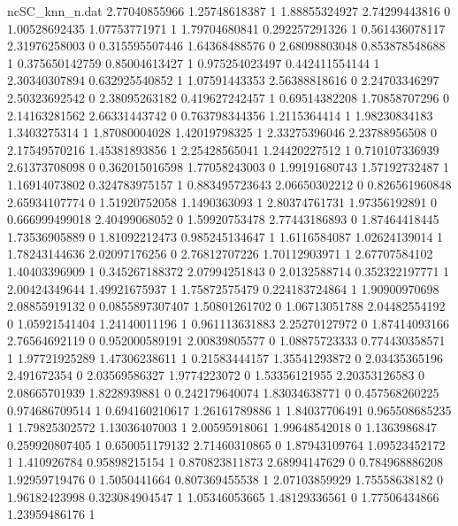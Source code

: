 \begin{filecontents}{ncSC_knn_n.dat}
2.77040855966 1.25748618387 1
1.88855324927 2.74299443816 0
1.00528692435 1.07753771971 1
1.79704680841 0.292257291326 1
0.561436078117 2.31976258003 0
0.315595507446 1.64368488576 0
2.68098803048 0.853878548688 1
0.375650142759 0.85004613427 1
0.975254023497 0.442411554144 1
2.30340307894 0.632925540852 1
1.07591443353 2.56388818616 0
2.24703346297 2.50323692542 0
2.38095263182 0.419627242457 1
0.69514382208 1.70858707296 0
2.14163281562 2.66331443742 0
0.763798344356 1.2115364414 1
1.98230834183 1.3403275314 1
1.87080004028 1.42019798325 1
2.33275396046 2.23788956508 0
2.17549570216 1.45381893856 1
2.25428565041 1.24420227512 1
0.710107336939 2.61373708098 0
0.362015016598 1.77058243003 0
1.99191680743 1.57192732487 1
1.16914073802 0.324783975157 1
0.883495723643 2.06650302212 0
0.826561960848 2.65934107774 0
1.51920752058 1.1490363093 1
2.80374761731 1.97356192891 0
0.666999499018 2.40499068052 0
1.59920753478 2.77443186893 0
1.87464418445 1.73536905889 0
1.81092212473 0.985245134647 1
1.6116584087 1.02624139014 1
1.78243144636 2.02097176256 0
2.76812707226 1.70112903971 1
2.67707584102 1.40403396909 1
0.345267188372 2.07994251843 0
2.0132588714 0.352322197771 1
2.00424349644 1.49921675937 1
1.75872575479 0.224183724864 1
1.90900970698 2.08855919132 0
0.0855897307407 1.50801261702 0
1.06713051788 2.04482554192 0
1.05921541404 1.24140011196 1
0.961113631883 2.25270127972 0
1.87414093166 2.76564692119 0
0.952000589191 2.00839805577 0
1.08875723333 0.774430358571 1
1.97721925289 1.47306238611 1
0.21583444157 1.35541293872 0
2.03435365196 2.491672354 0
2.03569586327 1.9774223072 0
1.53356121955 2.20353126583 0
2.08665701939 1.8228939881 0
0.242179640074 1.83034638771 0
0.457568260225 0.974686709514 1
0.694160210617 1.26161789886 1
1.84037706491 0.965508685235 1
1.79825302572 1.13036407003 1
2.00595918061 1.99648542018 0
1.1363986847 0.259920807405 1
0.650051179132 2.71460310865 0
1.87943109764 1.09523452172 1
1.410926784 0.95898215154 1
0.870823811873 2.68994147629 0
0.784968886208 1.92959719476 0
1.5050441664 0.807369455538 1
2.07103859929 1.75558638182 0
1.96182423998 0.323084904547 1
1.05346053665 1.48129336561 0
1.77506434866 1.23959486176 1
\end{filecontents}

